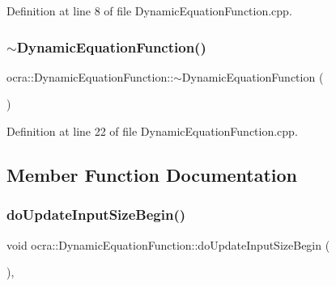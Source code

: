 Definition at line 8 of file Dynamic\+Equation\+Function.\+cpp.

\hypertarget{classocra_1_1DynamicEquationFunction_a84c82f21c1564aaca6b5aa703ecae73e}{}\label{classocra_1_1DynamicEquationFunction_a84c82f21c1564aaca6b5aa703ecae73e} 
\subsubsection{\texorpdfstring{$\sim$\+Dynamic\+Equation\+Function()}{~DynamicEquationFunction()}}
{\footnotesize\ttfamily ocra\+::\+Dynamic\+Equation\+Function\+::$\sim$\+Dynamic\+Equation\+Function (\begin{DoxyParamCaption}{ }\end{DoxyParamCaption})}



Definition at line 22 of file Dynamic\+Equation\+Function.\+cpp.



\subsection{Member Function Documentation}
\hypertarget{classocra_1_1DynamicEquationFunction_a6fc52fcd947fa303e55729dbb286b92c}{}\label{classocra_1_1DynamicEquationFunction_a6fc52fcd947fa303e55729dbb286b92c} 
\subsubsection{\texorpdfstring{do\+Update\+Input\+Size\+Begin()}{doUpdateInputSizeBegin()}}
{\footnotesize\ttfamily void ocra\+::\+Dynamic\+Equation\+Function\+::do\+Update\+Input\+Size\+Begin (\begin{DoxyParamCaption}{ }\end{DoxyParamCaption})\hspace{0.3cm}{\ttfamily [protected]}, {\ttfamily [virtual]}}

